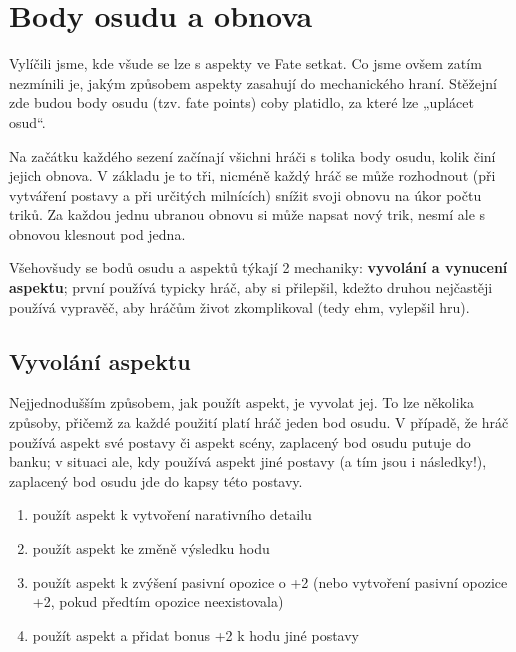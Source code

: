 \documentclass[../main.tex]{subfiles}
\begin{document}
\section{Body osudu a obnova}
\label{sec:body-osudu-obnova}

Vylíčili jsme, kde všude se lze s aspekty ve Fate setkat. Co jsme ovšem zatím nezmínili je, jakým způsobem aspekty zasahují do mechanického hraní. Stěžejní zde budou body osudu (tzv. fate points) coby platidlo, za které lze „uplácet osud“.

Na začátku každého sezení začínají všichni hráči s tolika body osudu, kolik činí jejich obnova. V základu je to tři, nicméně každý hráč se může rozhodnout (při vytváření postavy a při určitých milnících) snížit svoji obnovu na úkor počtu triků. Za každou jednu ubranou obnovu si může napsat nový trik, nesmí ale s obnovou klesnout pod jedna.

Všehovšudy se bodů osudu a aspektů týkají 2 mechaniky: \textbf{vyvolání a vynucení aspektu}; první používá typicky hráč, aby si přilepšil, kdežto druhou nejčastěji používá vypravěč, aby hráčům život zkomplikoval (tedy ehm, vylepšil hru).

\subsection{Vyvolání aspektu}
\label{sec:vyvolani-aspektu}

Nejjednodušším způsobem, jak použít aspekt, je vyvolat jej. To lze několika způsoby, přičemž za každé použití platí hráč jeden bod osudu. V případě, že hráč používá aspekt své postavy či aspekt scény, zaplacený bod osudu putuje do banku; v situaci ale, kdy používá aspekt jiné postavy (a tím jsou i následky!), zaplacený bod osudu jde do kapsy této postavy.

\begin{pravidlo}
\begin{enumerate}
\item použít aspekt k vytvoření narativního detailu
\item použít aspekt ke změně výsledku hodu
\item použít aspekt k zvýšení pasivní opozice o +2 (nebo vytvoření pasivní opozice +2, pokud předtím opozice neexistovala)
\item použít aspekt a přidat bonus +2 k hodu jiné postavy
\end{enumerate}
\end{pravidlo}
\end{document}
